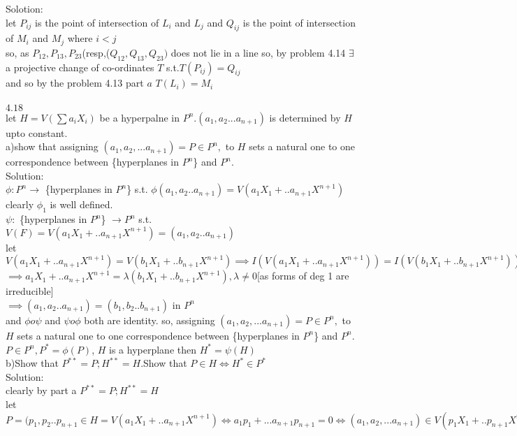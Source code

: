 \documentclass[11pt]{article}
\begin{document}
Solotion:\\
let $P_{ij}$ is the point of intersection of $L_i$ and $L_j$ and $Q_{ij}$ is the point of intersection of $M_i$ and $M_j$ where $i<j$\\
so, as $P_{12},P_{13},P_{23}$(resp,($Q_{12},Q_{13},Q_{23})$ does not lie in a line so, by problem 4.14  $\exists$ a projective change of co-ordinates $T$ s.t.$T(P_{ij})=Q_{ij}$\\
and so by the problem 4.13 part $a$ $T(L_i)=M_i$\\\\ 
$4.18$\\
let $H=V(\sum a_iX_i)$ be a hyperpalne in $P^n.(a_1,a_2...a_{n+1})$ is determined by $H$ upto constant.\\
a)show that assigning $(a_1,a_2,...a_{n+1})=P\in P^n,$ to $H$ sets a natural one to one correspondence between \{hyperplanes in $P^n$\} and $P^n$.\\
Solution:\\
$\phi:P^n\to $ \{hyperplanes in $P^n$\} s.t. $\phi(a_1,a_2..a_{n+1})=V(a_1X_1+..a_{n+1}X^{n+1})$\\
clearly $\phi_1$ is well defined.\\
$\psi:$ \{hyperplanes in $P^n$\} $\to P^n$ s.t.
$V(F)=V(a_1X_1+..a_{n+1}X^{n+1})=(a_1,a_2..a_{n+1})$\\
let $V(a_1X_1+..a_{n+1}X^{n+1})=V(b_1X_1+..b_{n+1}X^{n+1}) \implies I(V(a_1X_1+..a_{n+1}X^{n+1}))=I(V(b_1X_1+..b_{n+1}X^{n+1}))$\\
$\implies a_1X_1+..a_{n+1}X^{n+1}=\lambda(b_1X_1+..b_{n+1}X^{n+1}),\lambda\neq 0$[as forms of deg 1 are irreducible]\\
$\implies (a_1,a_2..a_{n+1})=(b_1,b_2..b_{n+1}) $ in $P^n$\\
and $\phi o \psi$ and $\psi o \phi$ both are identity.
so, assigning $(a_1,a_2,...a_{n+1})=P\in P^n,$ to $H$ sets a natural one to one correspondence between \{hyperplanes in $P^n$\} and $P^n$.\\
$P\in P^{n},P^*=\phi(P)$, $H$ is a hyperplane then $H^*=\psi(H)$\\
b)Show that $P^{**}=P;H^{**}=H$.Show that $P\in H\iff H^{*}\in P^{*}$\\
Solution:\\
clearly by part a  $P^{**}=P;H^{**}=H$\\
let $P=(p_1,p_2..p_{n+1}\in H=V(a_1X_1+..a_{n+1}X^{n+1})\iff a_1p_1+...a_{n+1}p_{n+1}=0\iff (a_1,a_2,...a_{n+1})\in V(p_1X_1+..p_{n+1}X^{n+1})\iff H^{*}\in P^{*}$\\
\end{document}

